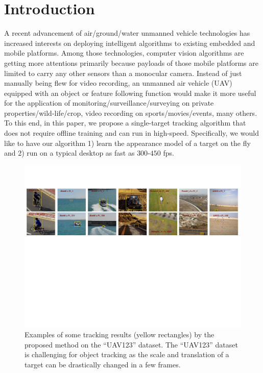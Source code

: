 \documentclass[10pt,twocolumn,letterpaper]{article}
\begin{document}
\section{Introduction}
\label{introduction}
A recent advancement of air/ground/water unmanned vehicle technologies
has increased interests on deploying intelligent algorithms to
existing embedded and mobile platforms. Among those technologies,
computer vision algorithms are getting more attentions primarily
because payloads of those mobile platforms are limited to carry any
other sensors than a monocular camera. Instead of just manually being
flew for video recording, an unmanned air vehicle (UAV) equipped with
an object or feature following function would make it more useful for
the application of monitoring/surveillance/surveying on private
properties/wild-life/crop, video recording on sports/movies/events,
many others. To this end, in this paper, we propose a single-target
tracking algorithm that does not require offline training and can run
in high-speed. Specifically, we would like to have our algorithm 1)
learn the appearance model of a target on the fly and 2) run on a
typical desktop as fast as $300$-$450$ fps.

\begin{figure}[!h]
\centering
\includegraphics[width=\textwidth]{./figures/ResultsIntroduction.pdf}
\caption{Examples of some tracking results (yellow rectangles) by the
  proposed method on the ``UAV123'' dataset. The ``UAV123'' dataset is
  challenging for object tracking as the scale and translation of a
  target can be drastically changed in a few frames.}
\label{ResultsIntroduction}
\end{figure}
\end{document}

